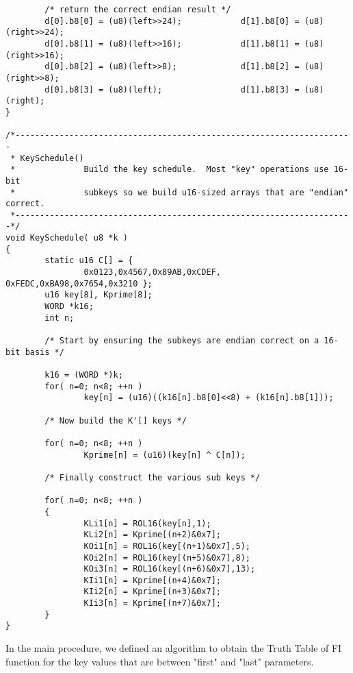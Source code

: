 \begin{verbatim}
        /* return the correct endian result */
        d[0].b8[0] = (u8)(left>>24);            d[1].b8[0] = (u8)(right>>24);
        d[0].b8[1] = (u8)(left>>16);            d[1].b8[1] = (u8)(right>>16);
        d[0].b8[2] = (u8)(left>>8);             d[1].b8[2] = (u8)(right>>8);
        d[0].b8[3] = (u8)(left);                d[1].b8[3] = (u8)(right);
}

/*---------------------------------------------------------------------
 * KeySchedule()
 *              Build the key schedule.  Most "key" operations use 16-bit
 *              subkeys so we build u16-sized arrays that are "endian" correct.
 *---------------------------------------------------------------------*/
void KeySchedule( u8 *k )
{
        static u16 C[] = {
                0x0123,0x4567,0x89AB,0xCDEF, 0xFEDC,0xBA98,0x7654,0x3210 };
        u16 key[8], Kprime[8];
        WORD *k16;
        int n;

        /* Start by ensuring the subkeys are endian correct on a 16-bit basis */

        k16 = (WORD *)k;
        for( n=0; n<8; ++n )
                key[n] = (u16)((k16[n].b8[0]<<8) + (k16[n].b8[1]));

        /* Now build the K'[] keys */

        for( n=0; n<8; ++n )
                Kprime[n] = (u16)(key[n] ^ C[n]);

        /* Finally construct the various sub keys */

        for( n=0; n<8; ++n )
        {
                KLi1[n] = ROL16(key[n],1);
                KLi2[n] = Kprime[(n+2)&0x7];
                KOi1[n] = ROL16(key[(n+1)&0x7],5);
                KOi2[n] = ROL16(key[(n+5)&0x7],8);
                KOi3[n] = ROL16(key[(n+6)&0x7],13);
                KIi1[n] = Kprime[(n+4)&0x7];
                KIi2[n] = Kprime[(n+3)&0x7];
                KIi3[n] = Kprime[(n+7)&0x7];
        }
}
\end{verbatim}

In the main procedure, we defined an algorithm to obtain the Truth Table of FI function for the key values that are between "first" and "last" parameters.

